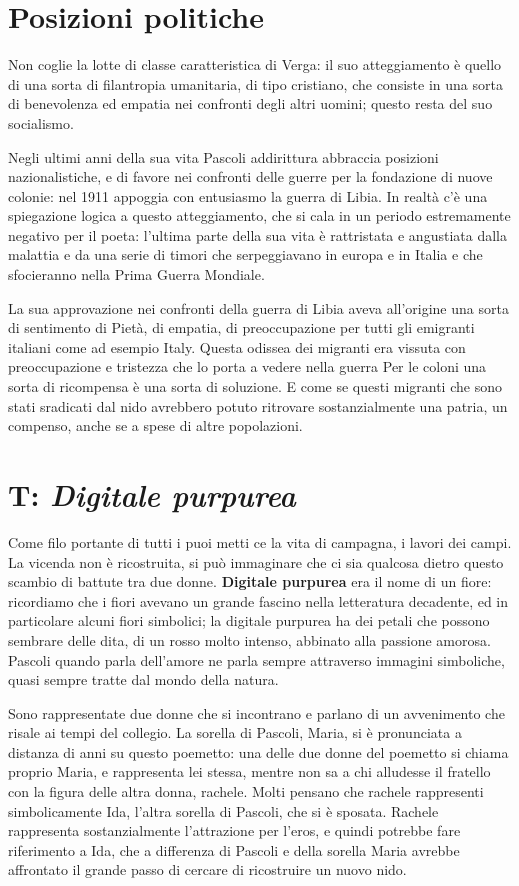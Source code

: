 \documentclass[a4paper, twoside, titlepage]{book}
\begin{document}
\section{Posizioni politiche}

Non coglie la lotte di classe caratteristica di Verga: il suo atteggiamento è quello di una sorta di filantropia umanitaria, di tipo cristiano, che consiste in una sorta di benevolenza ed empatia nei confronti degli altri uomini; questo resta del suo socialismo.

Negli ultimi anni della sua vita Pascoli addirittura abbraccia posizioni nazionalistiche, e di favore nei confronti delle guerre per la fondazione di nuove colonie: nel 1911 appoggia con entusiasmo la guerra di Libia. In realtà c'è una spiegazione logica a questo atteggiamento, che si cala in un periodo estremamente negativo per il poeta: l'ultima parte della sua vita è rattristata e angustiata dalla malattia e da una serie di timori che serpeggiavano in europa e in Italia e che sfocieranno nella Prima Guerra Mondiale.

La sua approvazione nei confronti della guerra di Libia aveva all'origine una sorta di sentimento di Pietà, di empatia, di preoccupazione per tutti gli emigranti italiani come ad esempio Italy. Questa odissea dei migranti era vissuta con preoccupazione e tristezza che lo porta a vedere nella guerra Per le coloni una sorta di ricompensa è una sorta di soluzione. E come se questi migranti che sono stati sradicati dal nido avrebbero potuto ritrovare sostanzialmente una patria, un compenso, anche se a spese di altre popolazioni.

\section{T: \textit{Digitale purpurea}}

Come filo portante di tutti i puoi metti ce la vita di campagna, i lavori dei campi. La vicenda non è ricostruita, si può immaginare che ci sia qualcosa dietro questo scambio di battute tra due donne.
\textbf{Digitale purpurea} era il nome di un fiore: ricordiamo che i fiori avevano un grande fascino nella letteratura decadente, ed in particolare alcuni fiori simbolici; la digitale purpurea ha dei petali che possono sembrare delle dita, di un rosso molto intenso, abbinato alla passione amorosa. Pascoli quando parla dell'amore ne parla sempre attraverso immagini simboliche, quasi sempre tratte dal mondo della natura.

Sono rappresentate due donne che si incontrano e parlano di un avvenimento che risale ai tempi del collegio. La sorella di Pascoli, Maria, si è pronunciata a distanza di anni su questo poemetto: una delle due donne del poemetto si chiama proprio Maria, e rappresenta lei stessa, mentre non sa a chi alludesse il fratello con la figura delle altra donna, rachele.
Molti pensano che rachele rappresenti simbolicamente Ida, l'altra sorella di Pascoli, che si è sposata.
Rachele rappresenta sostanzialmente l'attrazione per l'eros, e quindi potrebbe fare riferimento a Ida, che a differenza di Pascoli e della sorella Maria avrebbe affrontato il grande passo di cercare di ricostruire un nuovo nido.
\end{document}

